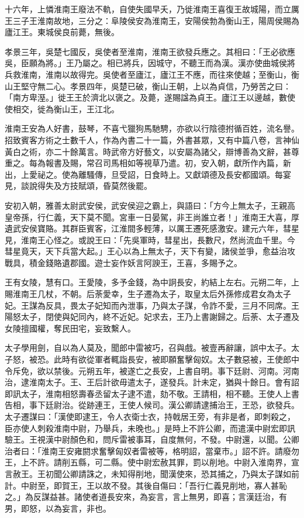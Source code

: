 \begin{pinyinscope}
十六年，上憐淮南王廢法不軌，自使失國早夭，乃徙淮南王喜復王故城陽，而立厲王三子王淮南故地，三分之：阜陵侯安為淮南王，安陽侯勃為衡山王，陽周侯賜為廬江王。東城侯良前薨，無後。

孝景三年，吳楚七國反，吳使者至淮南，淮南王欲發兵應之。其相曰：「王必欲應吳，臣願為將。」王乃屬之。相已將兵，因城守，不聽王而為漢。漢亦使曲城侯將兵救淮南，淮南以故得完。吳使者至廬江，廬江王不應，而往來使越；至衡山，衡山王堅守無二心。孝景四年，吳楚已破，衡山王朝，上以為貞信，乃勞苦之曰：「南方卑溼。」徙王王於濟北以褒之。及薨，遂賜諡為貞王。廬江王以邊越，數使使相交，徙為衡山王，王江北。

淮南王安為人好書，鼓琴，不喜弋獵狗馬馳騁，亦欲以行陰德拊循百姓，流名譽。招致賓客方術之士數千人，作為內書二十一篇，外書甚眾，又有中篇八卷，言神仙黃白之術，亦二十餘萬言。時武帝方好藝文，以安屬為諸父，辯博善為文辭，甚尊重之。每為報書及賜，常召司馬相如等視草乃遣。初，安入朝，獻所作內篇，新出，上愛祕之。使為離騷傳，旦受詔，日食時上。又獻頌德及長安都國頌。每宴見，談說得失及方技賦頌，昏莫然後罷。

安初入朝，雅善太尉武安侯，武安侯迎之霸上，與語曰：「方今上無太子，王親高皇帝孫，行仁義，天下莫不聞。宮車一日晏駕，非王尚誰立者！」淮南王大喜，厚遺武安侯寶賂。其群臣賓客，江淮間多輕薄，以厲王遷死感激安。建元六年，彗星見，淮南王心怪之。或說王曰：「先吳軍時，彗星出，長數尺，然尚流血千里。今彗星竟天，天下兵當大起。」王心以為上無太子，天下有變，諸侯並爭，愈益治攻戰具，積金錢賂遺郡國。遊士妄作妖言阿諛王，王喜，多賜予之。

王有女陵，慧有口。王愛陵，多予金錢，為中詗長安，約結上左右。元朔二年，上賜淮南王几杖，不朝。后荼愛幸，生子遷為太子，取皇太后外孫修成君女為太子妃。王謀為反具，畏太子妃知而內泄事，乃與太子謀，令詐不愛，三月不同席。王陽怒太子，閉使與妃同內，終不近妃。妃求去，王乃上書謝歸之。后荼、太子遷及女陵擅國權，奪民田宅，妄致繫人。

太子學用劍，自以為人莫及，聞郎中雷被巧，召與戲。被壹再辭讓，誤中太子。太子怒，被恐。此時有欲從軍者輒詣長安，被即願奮擊匈奴。太子數惡被，王使郎中令斥免，欲以禁後。元朔五年，被遂亡之長安，上書自明。事下廷尉、河南。河南治，逮淮南太子。王、王后計欲毋遣太子，遂發兵。計未定，猶與十餘日。會有詔即訊太子，淮南相怒壽春丞留太子逮不遣，劾不敬。王請相，相不聽。王使人上書告相，事下廷尉治。從跡連王，王使人候司。漢公卿請逮捕治王，王恐，欲發兵。太子遷謀曰：「漢使即逮王，令人衣衛士衣，持戟居王旁，有非是者，即刺殺之，臣亦使人刺殺淮南中尉，乃舉兵，未晚也。」是時上不許公卿，而遣漢中尉宏即訊驗王。王視漢中尉顏色和，問斥雷被事耳，自度無何，不發。中尉還，以聞。公卿治者曰：「淮南王安雍閼求奮擊匈奴者雷被等，格明詔，當棄市。」詔不許。請廢勿王，上不許。請削五縣，可二縣。使中尉宏赦其罪，罰以削地。中尉入淮南界，宣言赦王。王初聞公卿請誅之，未知得削地，聞漢使來，恐其捕之，乃與太子謀如前計。中尉至，即賀王，王以故不發。其後自傷曰：「吾行仁義見削地，寡人甚恥之。」為反謀益甚。諸使者道長安來，為妄言，言上無男，即喜；言漢廷治，有男，即怒，以為妄言，非也。


\end{pinyinscope}
